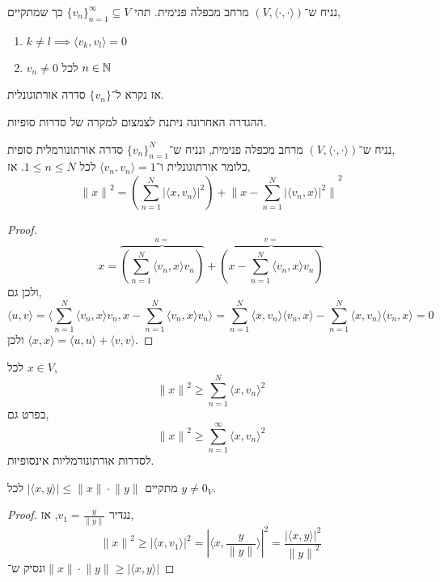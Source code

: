 \begin{definition}
	נניח ש־$(V, \langle \cdot, \cdot \rangle)$ מרחב מכפלה פנימית.
	תהי ${\{ v_n \}}_{n = 1}^\infty \subseteq V$ כך שמתקיים,
	\begin{enumerate}
		\item $k \ne l \implies \langle v_k, v_l \rangle = 0$
		\item $v_n \ne 0$ לכל $n \in \mathbb{N}$
	\end{enumerate}
	אז נקרא ל־$\{ v_n \}$ סדרה אורתוגונלית.
\end{definition}
\begin{remark}
	ההגדרה האחרונה ניתנת לצמצום למקרה של סדרות סופיות.
\end{remark}
\begin{theorem}[הפיתגורי]
	נניח ש־$(V, \langle \cdot, \cdot \rangle)$ מרחב מכפלה פנימית,
	ונניח ש־${\{ v_n \}}_{n = 1}^N$ סדרה אורתונורמלית סופית, \\
	כלומר אורתוגונלית ו־$\langle v_n, v_n \rangle = 1$ לכל $1 \le n \le N$.
	אז,
	\[
		{\lVert x \rVert}^2
		= \left( \sum_{n = 1}^N {|\langle x, v_n \rangle|}^2 \right) + {\lVert x - \sum_{n = 1}^N {|\langle v_n, x \rangle|}^2 \rVert}^2
	\]
\end{theorem}
\begin{proof}
	\[
		x = \overbrace{\left( \sum_{n = 1}^N \langle v_n, x \rangle v_n \right)}^{u = } + \overbrace{\left( x - \sum_{n = 1}^N \langle v_n, x \rangle v_n \right)}^{v = }
	\]
	ולכן גם,
	\[
		\langle u, v \rangle
		= \langle \sum_{n = 1}^N \langle v_n, x \rangle v_n, x - \sum_{n = 1}^N \langle v_n, x \rangle v_n \rangle
		= \sum_{n = 1}^N \langle x, v_n \rangle \langle v_n, x \rangle - \sum_{n = 1}^N \langle x, v_n \rangle \langle v_n, x \rangle
		= 0
	\]
	ולכן $\langle x, x \rangle = \langle u, u \rangle + \langle v, v \rangle$.
\end{proof}
\begin{conclusion}
	לכל $x \in V$,
	\[
		{\lVert x \rVert}^2
		\ge \sum_{n = 1}^N {\langle x, v_n \rangle}^2
	\]
	בפרט גם,
	\[
		{\lVert x \rVert}^2
		\ge \sum_{n = 1}^\infty {\langle x, v_n \rangle}^2
	\]
	לסדרות אורתונורמליות אינסופיות.
\end{conclusion}
\begin{conclusion}
	מתקיים $|\langle x, y \rangle| \le \lVert x \rVert \cdot \lVert y \rVert$ לכל $y \ne 0_V$.
\end{conclusion}
\begin{proof}
	נגדיר $v_1 = \frac{y}{\lVert y \rVert}$, אז,
	\[
		{\lVert x \rVert}^2
		\ge {|\langle x, v_1 \rangle|}^2
		= {\left\lvert \langle x, \frac{y}{\lVert y \rVert} \rangle\right\rvert}^2
		= \frac{{|\langle x, y \rangle|}^2}{{\lVert y \rVert}^2}
	\]
	ונסיק ש־$\lVert x \rVert \cdot \lVert y \rVert \ge |\langle x, y \rangle|$
\end{proof}
